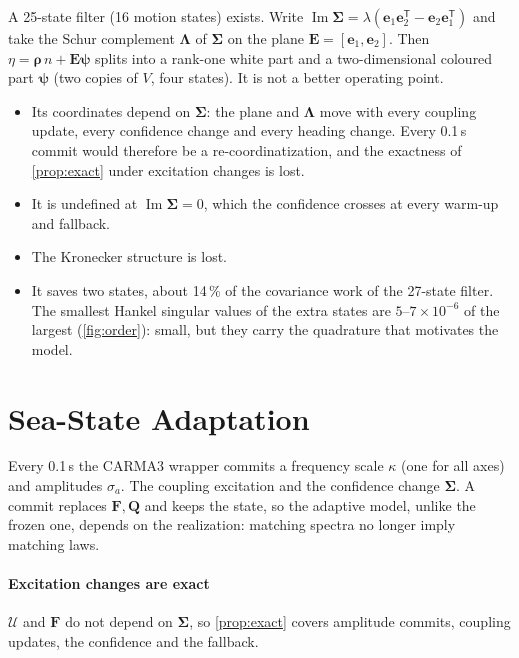 \documentclass[conference]{IEEEtran}
\DeclareRobustCommand{\vct}[1]{\bm{#1}}
\DeclareRobustCommand{\mat}[1]{\bm{#1}}
\newcommand{\T}{^{\mathsf T}}
\renewcommand{\Im}{\operatorname{Im}}
\theoremstyle{bodysmall}
\begin{document}
A 25-state filter (16 motion states) exists. Write $\Im\mat\Sigma=\lambda(\vct e_1\vct e_2\T-\vct e_2\vct e_1\T)$
and take the Schur complement $\mat\Lambda$ of $\mat\Sigma$ on the plane
$\mat E=[\vct e_1,\vct e_2]$. Then $\eta=\vct\rho\,n+\mat E\vct\psi$ splits
into a rank-one white part and a two-dimensional coloured part $\vct\psi$
(two copies of $V$, four states). It is not a better operating point.
\begin{itemize}
\item Its coordinates depend on $\mat\Sigma$: the plane and $\mat\Lambda$
  move with every coupling update, every confidence change and every heading
  change. Every 0.1\,s commit would therefore be a re-coordinatization, and the
  exactness of \cref{prop:exact} under excitation changes is lost.
\item It is undefined at $\Im\mat\Sigma=0$, which the confidence crosses at
  every warm-up and fallback.
\item The Kronecker structure is lost.
\item It saves two states, about 14\,\% of the covariance work of the 27-state
  filter. The smallest Hankel singular values of the extra states are
  $5$--$7\times10^{-6}$ of the largest (\cref{fig:order}): small, but they
  carry the quadrature that motivates the model.
\end{itemize}

\section{Sea-State Adaptation}
\label{sec:adapt}
Every 0.1\,s the CARMA3 wrapper commits a frequency scale $\kappa$ (one for
all axes) and amplitudes $\sigma_a$. The coupling excitation and the
confidence change $\mat\Sigma$. A commit replaces $\mat F,\mat Q$ and keeps the
state, so the adaptive model, unlike the frozen one, depends on the
realization: matching spectra no longer imply matching laws.

\paragraph{Excitation changes are exact}
$\mathcal U$ and $\mat F$ do not depend on $\mat\Sigma$, so \cref{prop:exact}
covers amplitude commits, coupling updates, the confidence and the
fallback.
\end{document}
